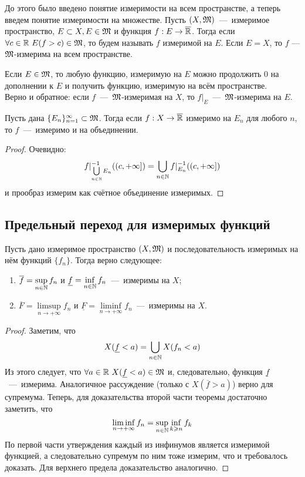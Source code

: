 \begin{note}
    До этого было введено понятие измеримости на всем пространстве, а теперь введем понятие измеримости на множестве.
    Пусть $(X, \mathfrak{M})$~---~измеримое пространство, $E \subset X, E \in \mathfrak{M}$ и функция $f: E \rightarrow \overline{\mathbb{R}}$. Тогда если $\forall c \in \mathbb{R} \  E(f > c) \in \mathfrak{M}$, то будем называть $f$ измеримой на $E$. Если $E = X$, то $f$ --- $\mathfrak{M}$-измерима на всем пространстве. \\

\end{note}
\begin{remark}
Если $E \in \mathfrak{M}$, то любую функцию, измеримую на $E$ можно продолжить 0 на дополнении к $E$ и получить функцию, измеримую на всём пространстве. \\
Верно и обратное: если $f$~---~$\mathfrak{M}$-измеримая на $X$, то $f|_E$~---~$\mathfrak{M}$-измерима на $E$.
\end{remark}

\begin{lemma}
    Пусть дана $\{E_n\}_{n = 1}^\infty \subset \mathfrak{M}$. Тогда если $f: X \rightarrow \overline{\mathbb{R}}$ измеримо на $E_n$ для любого $n$, то $f$~---~измеримо и на объединении.
\end{lemma}
\begin{proof}
    Очевидно: \[f|_{\bigcup\limits_{n \in \mathbb{N}} E_n}^{-1}((c, +\infty]) = \bigcup\limits_{n \in \mathbb{N}} f|_{E_n}^{-1}((c, +\infty])\] и прообраз измерим как счётное объединение измеримых.
\end{proof}
\subsection{Предельный переход для измеримых функций}
\begin{theorem}
    Пусть дано измеримое пространство $(X, \mathfrak{M})$ и последовательность измеримых на нём функций $\{f_n\}$. Тогда верно следующее:
    \begin{enumerate}
        \item $\overline{f} = \sup\limits_{n \in \mathbb{N}} f_n$ и $\underline{f} = \inf\limits_{n \in \mathbb{N}} f_n$~---~измеримы на $X$;
        \item $\overline{F} = \limsup\limits_{n \rightarrow +\infty} f_n$ и $\underline{F} = \liminf\limits_{n \rightarrow +\infty} f_n$~---~измеримы на $X$.
    \end{enumerate}
\end{theorem}
\begin{proof}
    Заметим, что \[X(\underline{f} < a) = \bigcup\limits_{n \in \mathbb{N}} X(f_n < a)\] Из этого следует, что $\forall a \in \mathbb{R} \  X(\underline{f} < a) \in \mathfrak{M}$ и, следовательно, функция $\underline{f}$~---~измерима. Аналогичное рассуждение (только с $X(\overline{f} > a)$) верно для супремума. Теперь, для доказательства второй части теоремы достаточно заметить, что \[\liminf\limits_{n \rightarrow +\infty} f_n = \sup\limits_{n \in \mathbb{N}} \inf\limits_{k \geqslant n} f_k\] По первой части утверждения каждый из инфинумов является измеримой функцией, а следовательно супремум по ним тоже измерим, что и требовалось доказать. Для верхнего предела доказательство аналогично.
\end{proof}

